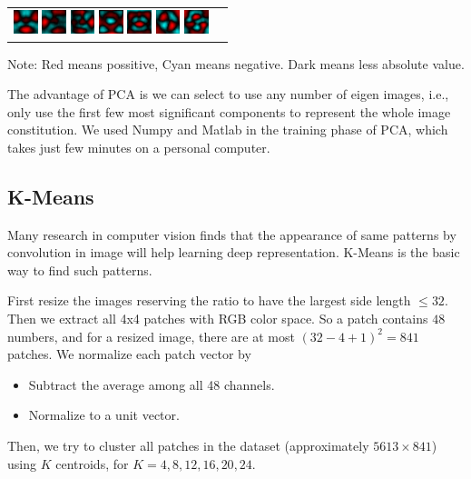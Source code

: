 \documentclass{acm_proc_article-sp}
\begin{document}
\begin{tabular}{p{1.3cm}p{6cm}}
        \includegraphics[width=20pt]{../data/PCA_visualize/eigvec10.png}
        \includegraphics[width=20pt]{../data/PCA_visualize/eigvec11.png}
        \includegraphics[width=20pt]{../data/PCA_visualize/eigvec12.png}
        \includegraphics[width=20pt]{../data/PCA_visualize/eigvec13.png}
        \includegraphics[width=20pt]{../data/PCA_visualize/eigvec14.png}
        \includegraphics[width=20pt]{../data/PCA_visualize/eigvec15.png}
        \includegraphics[width=20pt]{../data/PCA_visualize/eigvec16.png}
    \\
\end{tabular}

Note: Red means possitive, Cyan means negative. Dark means less absolute value.

The advantage of PCA is we can select to use any number of eigen images, i.e.,
only use the first few most significant components to represent the whole image
constitution. We used Numpy and Matlab in the training phase of PCA, which
takes just few minutes on a personal computer.

\subsection{K-Means}
Many research in computer vision finds that the appearance of same patterns
by convolution in image will help learning deep representation. K-Means is the
basic way to find such patterns.

First resize the images reserving the ratio to have the largest side length
$\leq 32$. Then we extract all 4x4 patches with RGB color space. So a patch
contains $48$ numbers, and for a resized image, there are at most
$(32-4+1)^2=841$ patches. We normalize each patch vector by
\begin{itemize}
\item Subtract the average among all 48 channels.
\item Normalize to a unit vector.
\end{itemize}
Then, we try to cluster all patches in the dataset (approximately $5613\times
841$) using $K$ centroids, for $K=4,8,12,16,20,24$.
\end{document}
